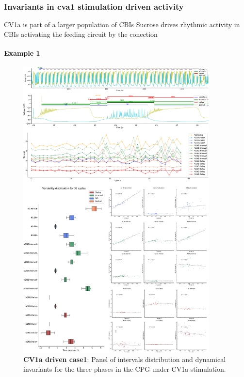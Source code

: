 \subsubsection{Invariants in cva1 stimulation driven activity}
CV1a is part of a larger population of CBIs 
Sucrose drives rhythmic activity in CBIs activating the feeding circuit by the conection
\paragraph{Example 1}

\begin{figure}[htbp]
	\centering
	\includegraphics[width=0.9\textwidth]{./invariants/data/SUSSEX/CV1a_driven1/images/3phases/panel_with_intervals.pdf}
	\caption{\textbf{CV1a driven case1}: Panel of intervals distribution and dynamical invariants for the three phases in the CPG under CV1a stimulation.}
	\label{fig:cv1a 1 3phases}
\end{figure}


